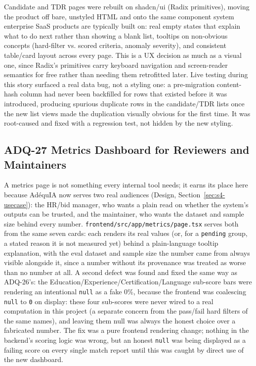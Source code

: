 Candidate and TDR pages were rebuilt on shadcn/ui (Radix primitives),
moving the product off bare, unstyled HTML and onto the same
component system enterprise SaaS products are typically built on: real
empty states that explain what to do next rather than showing a blank
list, tooltips on non-obvious concepts (hard-filter vs. scored criteria,
anomaly severity), and consistent table/card layout across every page.
This is a UX decision as much as a visual one, since Radix's primitives
carry keyboard navigation and screen-reader semantics for free rather
than needing them retrofitted later. Live testing during this story
surfaced a real data bug, not a styling one: a pre-migration
content-hash column had never been backfilled for rows that existed
before it was introduced, producing spurious duplicate rows in the
candidate/TDR lists once the new list views made the duplication
visually obvious for the first time. It was root-caused and fixed with a
regression test, not hidden by the new styling.

\subsection{ADQ-27 Metrics Dashboard for Reviewers and Maintainers}

A metrics page is not something every internal tool needs; it earns its
place here because AdéquIA now serves two real audiences (Design,
Section~\ref{sec:s4-usecase}): the HR/bid manager, who wants a plain
read on whether the system's outputs can be trusted, and the maintainer,
who wants the dataset and sample size behind every number.
\texttt{frontend/src/app/metrics/page.tsx} serves both from the same
seven cards: each renders its real values (or, for a \texttt{pending}
group, a stated reason it is not measured yet) behind a plain-language
tooltip explanation, with the eval dataset and sample size the number
came from always visible alongside it, since a number without its
provenance was treated as worse than no number at all. A second defect
was found and fixed the same way as ADQ-26's: the
Education/Experience/Certification/Language sub-score bars were rendering
an intentional \texttt{null} as a fake 0\%, because the frontend was
coalescing \texttt{null} to \texttt{0} on display: these four sub-scores
were never wired to a real computation in this project (a separate
concern from the pass/fail hard filters of the same names), and leaving
them null was always the honest choice over a fabricated number. The fix
was a pure frontend rendering change; nothing in the backend's scoring
logic was wrong, but an honest \texttt{null} was being displayed as a
failing score on every single match report until this was caught by
direct use of the new dashboard.


